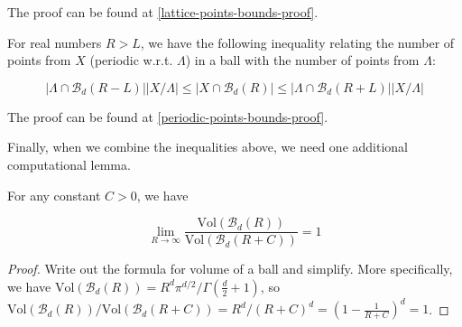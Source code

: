 The proof can be found at \cref{lattice-points-bounds-proof}.

\begin{theorem}\label{periodic-points-bounds}
  For real numbers $R > L$, we have the following inequality relating the number of points from $X$ (periodic w.r.t. $\Lambda$) in a ball with the number of points from $\Lambda$:

  \[
    \left|\Lambda \cap \mathcal{B}_d(R - L)\right|\left|X / \Lambda\right|
    \leq \left|X \cap \mathcal{B}_d(R)\right|
    \leq \left|\Lambda \cap \mathcal{B}_d(R + L)\right|\left|X / \Lambda\right|
  \]
\end{theorem}

The proof can be found at \cref{periodic-points-bounds-proof}.

Finally, when we combine the inequalities above, we need one additional computational lemma.

\begin{lemma}\label{volume-ball-ratio}
  For any constant $C > 0$, we have

  \[
    \lim_{R \to \infty} \frac{\mathrm{Vol}(\mathcal{B}_d(R))}{\mathrm{Vol}(\mathcal{B}_d(R + C))} = 1
  \]
\end{lemma}
\begin{proof}
  Write out the formula for volume of a ball and simplify. More specifically, we have $\mathrm{Vol}(\mathcal{B}_d(R)) = R^d \pi^{d / 2} / \Gamma\left(\frac{d}{2} + 1\right)$, so $\mathrm{Vol}(\mathcal{B}_d(R)) / \mathrm{Vol}(\mathcal{B}_d(R + C)) = R^d / (R + C)^d = \left(1 - \frac{1}{R + C}\right)^d = 1$.
\end{proof}

%


